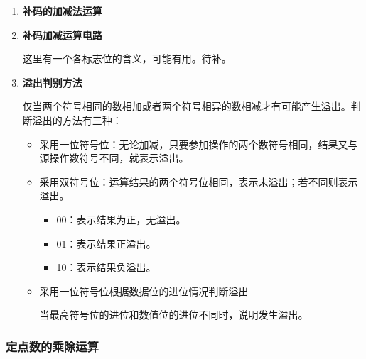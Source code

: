 \documentclass[12pt, a4paper, oneside]{ctexart}
\begin{document}
\begin{enumerate}
  \item {\bf 补码的加减法运算}
  \item {\bf 补码加减运算电路}
  
  这里有一个各标志位的含义，可能有用。待补。
  \item {\bf 溢出判别方法}
  
  仅当两个符号相同的数相加或者两个符号相异的数相减才有可能产生溢出。判断溢出的方法有三种：
  \begin{itemize}
    \item 采用一位符号位：无论加减，只要参加操作的两个数符号相同，结果又与源操作数符号不同，就表示溢出。
    \item 采用双符号位：运算结果的两个符号位相同，表示未溢出；若不同则表示溢出。
    \begin{itemize}
      \item 00：表示结果为正，无溢出。
      \item 01：表示结果正溢出。
      \item 10：表示结果负溢出。
    \end{itemize}
    \item 采用一位符号位根据数据位的进位情况判断溢出
    
    当最高符号位的进位和数值位的进位不同时，说明发生溢出。
  \end{itemize}
\end{enumerate}

\subsubsection{定点数的乘除运算}
\end{document}
